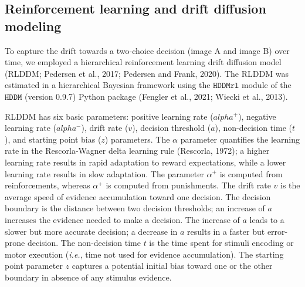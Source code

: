 \documentclass[
  man,floatsintext]{apa6}
\begin{document}
\hypertarget{reinforcement-learning-and-drift-diffusion-modeling}{%
\subsection{Reinforcement learning and drift diffusion modeling}\label{reinforcement-learning-and-drift-diffusion-modeling}}

To capture the drift towards a two-choice decision (image A and image B) over time, we employed a hierarchical reinforcement learning drift diffusion model (RLDDM; Pedersen et al., 2017; Pedersen and Frank, 2020). The RLDDM was estimated in a hierarchical Bayesian framework using the \(\texttt{HDDMrl}\) module of the \(\texttt{HDDM}\) (version 0.9.7) Python package (Fengler et al., 2021; Wiecki et al., 2013).

RLDDM has six basic parameters: positive learning rate (\(alpha^+\)), negative learning rate (\(alpha^-\)), drift rate (\(v\)), decision threshold (\(a\)), non-decision time (\(t\)), and starting point bias (\(z\)) parameters. The \(\alpha\) parameter quantifies the learning rate in the Rescorla-Wagner delta learning rule (Rescorla, 1972); a higher learning rate results in rapid adaptation to reward expectations, while a lower learning rate results in slow adaptation. The parameter \(\alpha^+\) is computed from reinforcements, whereas \(\alpha^+\) is computed from punishments. The drift rate \(v\) is the average speed of evidence accumulation toward one decision. The decision boundary is the distance between two decision thresholds; an increase of \(a\) increases the evidence needed to make a decision. The increase of \(a\) leads to a slower but more accurate decision; a decrease in \(a\) results in a faster but error-prone decision. The non-decision time \(t\) is the time spent for stimuli encoding or motor execution (\emph{i.e.}, time not used for evidence accumulation). The starting point parameter \(z\) captures a potential initial bias toward one or the other boundary in absence of any stimulus evidence.
\end{document}
